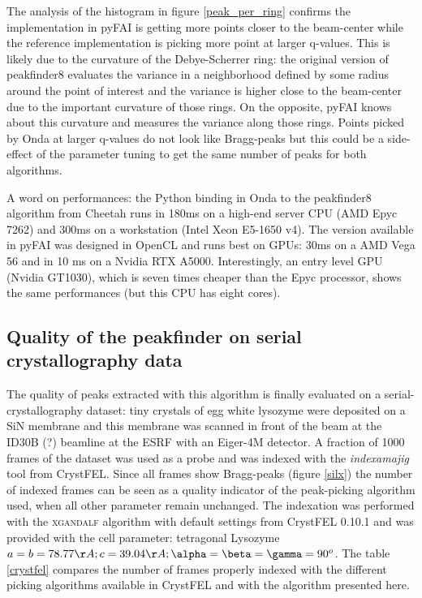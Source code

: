 \documentclass[preprint]{iucr}              %
\begin{document}
The analysis of the histogram in figure \ref{peak_per_ring} confirms the implementation in pyFAI is getting more points closer to the beam-center while the reference implementation is picking more point at larger q-values.
This is likely due to the curvature of the Debye-Scherrer ring: the original version of peakfinder8 evaluates the variance in a neighborhood defined by some radius around the point of interest and the variance is higher close to the beam-center due to the important curvature of those rings.
On the opposite, pyFAI knows about this curvature and measures the variance along those rings.
Points picked by Onda at larger q-values do not look like Bragg-peaks but this could be a side-effect of the parameter tuning to get the same number of peaks for both algorithms.

A word on performances: the Python binding in Onda to the peakfinder8 algorithm from Cheetah runs in 180ms on a high-end server CPU (AMD Epyc 7262) and 300ms on a workstation (Intel Xeon E5-1650 v4). 
The version available in pyFAI was designed in OpenCL \cite{opencl_khronos, opencl, pyopencl} and runs best on GPUs: 30ms on a AMD Vega 56 and in 10 ms on a Nvidia RTX A5000. 
Interestingly, an entry level GPU (Nvidia GT1030), which is seven times cheaper than the Epyc processor, shows the same performances (but this CPU has eight cores).

\subsection{Quality of the peakfinder on serial crystallography data}

The quality of peaks extracted with this algorithm is finally evaluated on a serial-crystallography dataset: tiny crystals of egg white lysozyme were deposited on a SiN membrane and this membrane was scanned in front of the beam at the ID30B (?) beamline at the ESRF with an Eiger-4M detector.
A fraction of 1000 frames of the dataset \cite{ssx-Lyso} was used as a probe and was indexed with the \textit{indexamajig} tool from CrystFEL. 
Since all frames show Bragg-peaks (figure \ref{silx}) the number of indexed frames can be seen as a quality indicator of the peak-picking algorithm used, when all other parameter remain unchanged.
The indexation was performed with the \textsc{xgandalf} algorithm \cite{xgandalf} with default settings from CrystFEL 0.10.1 and was provided with the cell parameter: tetragonal Lysozyme $a=b=78.77\AA; c=39.04\AA; \alpha=\beta=\gamma = 90^o$.
The table \ref{crystfel} compares the number of frames properly indexed with the different picking algorithms available in CrystFEL and with the algorithm presented here. 
\end{document}

